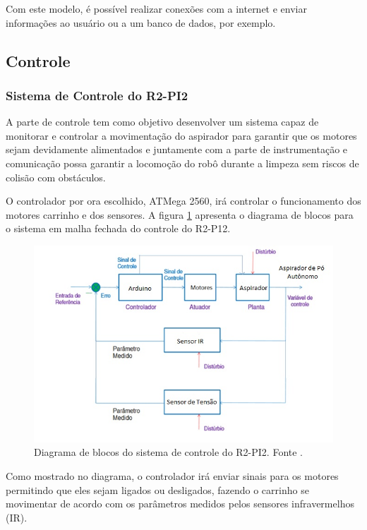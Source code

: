   Com este modelo, é possível realizar conexões com a internet e enviar informações ao usuário ou a um banco de dados, por exemplo.

\subsection{Controle} %
	\label{sub:controle}

		\subsubsection{Sistema de Controle do R2-PI2}

			A parte de controle tem como objetivo desenvolver um sistema capaz de monitorar e controlar a movimentação do aspirador para garantir que os motores sejam devidamente alimentados e juntamente com a parte de instrumentação e comunicação possa garantir a locomoção do robô durante a limpeza sem riscos de colisão com obstáculos.

			O controlador por ora escolhido, ATMega 2560, irá controlar o funcionamento dos motores carrinho e dos sensores. A figura \ref{img:diagrama_sistema_controle} apresenta o diagrama de blocos para o sistema em malha fechada do controle do R2-P12.

			\begin{figure}[H]
				\centering
				\includegraphics[scale=0.55]{figuras/diagrama_blocos_R2PI2.png}
				\caption{Diagrama de blocos do sistema de controle do R2-PI2. Fonte \cite{mello}.}
				\label{img:diagrama_sistema_controle}
			\end{figure}

			Como mostrado no diagrama, o controlador irá enviar sinais para os motores permitindo que eles sejam ligados ou desligados, fazendo o carrinho se movimentar de acordo com os parâmetros medidos pelos sensores infravermelhos (IR). 


